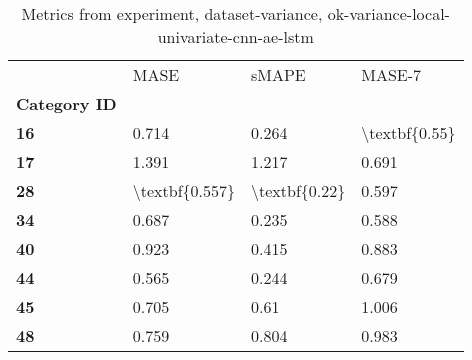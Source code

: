 \begin{table}[h]
\centering
\caption{Metrics from experiment, dataset-variance, ok-variance-local-univariate-cnn-ae-lstm}
\label{table:ok-variance-local-univariate-cnn-ae-lstm-dataset-variance}
\begin{tabular}{llll}
\toprule
{} &            MASE &          sMAPE &         MASE-7 \\
\textbf{Category ID} &                 &                &                \\
\midrule
\textbf{16         } &           0.714 &          0.264 &  \textbackslash textbf\{0.55\} \\
\textbf{17         } &           1.391 &          1.217 &          0.691 \\
\textbf{28         } &  \textbackslash textbf\{0.557\} &  \textbackslash textbf\{0.22\} &          0.597 \\
\textbf{34         } &           0.687 &          0.235 &          0.588 \\
\textbf{40         } &           0.923 &          0.415 &          0.883 \\
\textbf{44         } &           0.565 &          0.244 &          0.679 \\
\textbf{45         } &           0.705 &           0.61 &          1.006 \\
\textbf{48         } &           0.759 &          0.804 &          0.983 \\
\bottomrule
\end{tabular}
\end{table}
